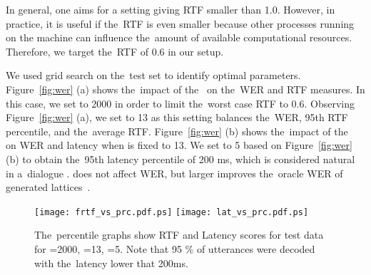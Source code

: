 In general, one aims for a setting giving RTF smaller than 1.0.
However, in practice, it is useful if the~RTF is even smaller because other processes running on the machine can influence the~amount of available computational resources.
Therefore, we target the~RTF of 0.6 in our setup.

We used grid search on the~test set to identify optimal parameters.
Figure~\ref{fig:wer} (a) shows the~impact of the~ on the~WER and RTF measures.
In this case, we set  to 2000 in order to limit the~worst case RTF to 0.6.
Observing Figure~\ref{fig:wer} (a), we set  to 13 as this setting balances the~WER, 95th RTF percentile, and the~average RTF.
Figure~\ref{fig:wer} (b) shows the~impact of the~ on WER and latency when  is fixed to 13.
We set  to 5 based on Figure~\ref{fig:wer} (b) to obtain the~95th latency percentile of 200 ms, which is considered natural in a~dialogue \cite{skantze2009incremental}.
 does not affect WER, but larger  improves the~oracle WER of generated lattices~\cite{povey2012generating}.

\begin{figure*}[t]
    \begin{center}
    \texttt{[image: frtf\_vs\_prc.pdf.ps]}
    \texttt{[image: lat\_vs\_prc.pdf.ps]}
    \caption{The~percentile graphs show RTF and Latency scores for test data for =2000, =13, =5.
Note that 95 \% of utterances were decoded with the~latency lower that 200ms.}
    \label{fig:prc}
    \end{center}
\end{figure*}



